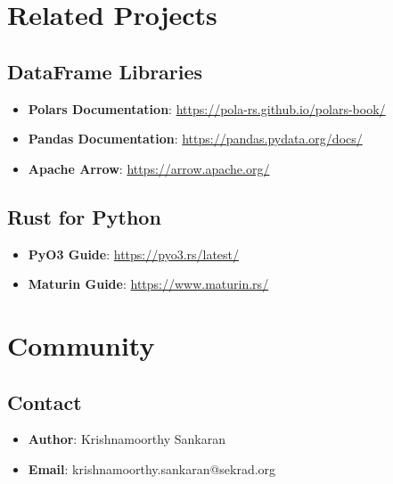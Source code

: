 \documentclass[
  letterpaper,
]{scrbook}
\providecommand{\tightlist}{%
  \setlength{\itemsep}{0pt}\setlength{\parskip}{0pt}}
\begin{document}
\section*{Related Projects}\label{related-projects}


\subsection*{DataFrame Libraries}\label{dataframe-libraries}

\begin{itemize}
\tightlist
\item
  \textbf{Polars Documentation}:
  \url{https://pola-rs.github.io/polars-book/}
\item
  \textbf{Pandas Documentation}: \url{https://pandas.pydata.org/docs/}
\item
  \textbf{Apache Arrow}: \url{https://arrow.apache.org/}
\end{itemize}

\subsection*{Rust for Python}\label{rust-for-python}

\begin{itemize}
\tightlist
\item
  \textbf{PyO3 Guide}: \url{https://pyo3.rs/latest/}
\item
  \textbf{Maturin Guide}: \url{https://www.maturin.rs/}
\end{itemize}

\section*{Community}\label{community}


\subsection*{Contact}\label{contact}

\begin{itemize}
\tightlist
\item
  \textbf{Author}: Krishnamoorthy Sankaran
\item
  \textbf{Email}: krishnamoorthy.sankaran@sekrad.org
\end{itemize}
\end{document}
